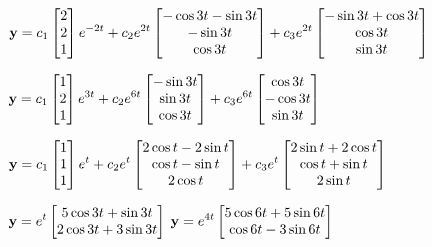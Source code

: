 \smallskip
{}
$\displaystyle{\mathbf{y}=c_1\begin{bmatrix} 2\\ 2\\1\end{bmatrix}e^{-2t}+
c_2e^{2t}\begin{bmatrix}-\cos3t-\sin3t\\-\sin3t\\\cos3t\end{bmatrix}
+c_3e^{2t}\begin{bmatrix}-\sin3t+\cos3t\\\cos3t\\\sin3t\end{bmatrix}}$

\smallskip
{}
$\displaystyle{\mathbf{y}=c_1\begin{bmatrix}1\\2\\1\end{bmatrix}e^{3t}
+c_2e^{6t}\begin{bmatrix}-\sin3t\\\sin3t\\\cos3t\end{bmatrix}
+c_3e^{6t}\begin{bmatrix}\cos3t\\-\cos3t\\\sin3t\end{bmatrix}}$

\smallskip
{}
$\displaystyle{\mathbf{y}=c_1\begin{bmatrix} 1\\1\\1\end{bmatrix}e^t
+c_2e^t\begin{bmatrix} 2\cos t-2\sin t\\\cos t-\sin t\\ 2\cos t\end{bmatrix}
+c_3e^t\begin{bmatrix} 2\sin t+2\cos t\\\cos t+\sin t\\2\sin t\end{bmatrix}}$

\smallskip
{}
$\displaystyle{\mathbf{y}=e^t\begin{bmatrix}
5\cos3t+\sin3t\\2\cos3t+3\sin3t\end{bmatrix}}$
$\displaystyle{\mathbf{y}=e^{4t}\begin{bmatrix}5\cos6t+5\sin6t\\\cos6t-3\sin6t
\end{bmatrix}}$

